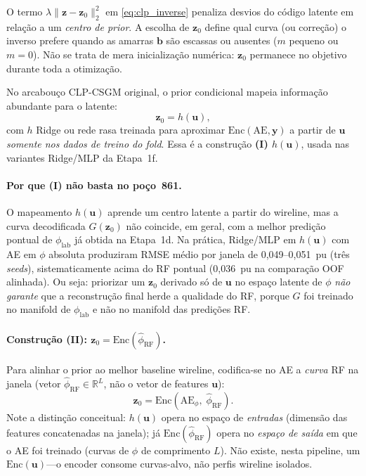 \documentclass[11pt,a4paper]{article}
\newcommand{\philab}{\ensuremath{\phi_{\mathrm{lab}}}}
\newcommand{\zvec}{\ensuremath{\mathbf{z}}}
\newcommand{\zzero}{\ensuremath{\mathbf{z}_0}}
\begin{document}
O termo $\lambda\|\zvec-\zzero\|_2^2$ em \eqref{eq:clp_inverse} penaliza
desvios do código latente em relação a um \emph{centro de prior}.
A escolha de $\zzero$ define qual curva (ou correção) o inverso prefere
quando as amarras $\mathbf{b}$ são escassas ou ausentes ($m$ pequeno ou
$m=0$).
Não se trata de mera inicialização numérica: $\zzero$ permanece no
objetivo durante toda a otimização.

No arcabouço CLP-CSGM original, o prior condicional mapeia informação
abundante para o latente:
\begin{equation}
  \zzero = h(\mathbf{u}),
  \label{eq:clp_h_u}
\end{equation}
com $h$ Ridge ou rede rasa treinada para aproximar
$\mathrm{Enc}(\mathrm{AE},\mathbf{y})$ a partir de $\mathbf{u}$
\emph{somente nos dados de treino do fold}.
Essa é a construção \textbf{(I) $h(\mathbf{u})$}, usada nas variantes
Ridge/MLP da Etapa~1f.

\paragraph{Por que (I) não basta no poço~861.}
O mapeamento $h(\mathbf{u})$ aprende um centro latente a partir do
wireline, mas a curva decodificada $G(\zzero)$ não coincide, em geral,
com a melhor predição pontual de \philab{} já obtida na Etapa~1d.
Na prática, Ridge/MLP em $h(\mathbf{u})$ com AE em $\phi$ absoluta
produziram RMSE médio por janela de 0,049--0,051~pu (três \emph{seeds}),
sistematicamente acima do RF pontual (0,036~pu na comparação OOF
alinhada).
Ou seja: priorizar um $\zzero$ derivado só de $\mathbf{u}$ no espaço
latente de $\phi$ \emph{não garante} que a reconstrução final herde a
qualidade do RF, porque $G$ foi treinado no manifold de $\phi_{\mathrm{lab}}$
e não no manifold das predições RF.

\paragraph{Construção (II): $\zzero=\mathrm{Enc}(\widehat{\phi}_{\mathrm{RF}})$.}
Para alinhar o prior ao melhor baseline wireline, codifica-se no AE a
\emph{curva} RF na janela (vetor $\widehat{\phi}_{\mathrm{RF}}\in\mathbb{R}^L$,
não o vetor de features $\mathbf{u}$):
\begin{equation}
  \zzero
  =
  \mathrm{Enc}\!\left(
    \mathrm{AE}_{\phi},\;
    \widehat{\phi}_{\mathrm{RF}}
  \right).
  \label{eq:clp_enc_rf}
\end{equation}
Note a distinção conceitual: $h(\mathbf{u})$ opera no espaço de
\emph{entradas} (dimensão das features concatenadas na janela); já
$\mathrm{Enc}(\widehat{\phi}_{\mathrm{RF}})$ opera no \emph{espaço de
saída} em que o AE foi treinado (curvas de $\phi$ de comprimento $L$).
Não existe, nesta pipeline, um $\mathrm{Enc}(\mathbf{u})$---o encoder
consome curvas-alvo, não perfis wireline isolados.
\end{document}
